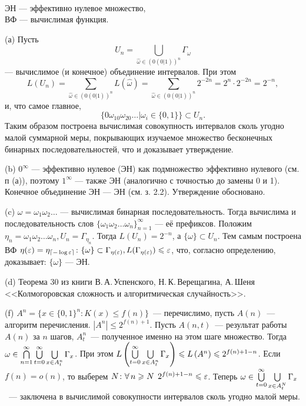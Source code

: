 \\
ЭН --- эффективно нулевое множество,\\
ВФ --- вычислимая функция.

(а) Пусть $$U_n=\bigcup\limits_{\hat\omega\in\left(0(0|1)\right)^n}\Gamma_{\hat\omega}$$ --- вычислимое (и конечное) объединение интервалов. При этом $$L(U_n)=\sum\limits_{\hat\omega\in\left(0(0|1)\right)^n}L(\hat\omega) = \sum\limits_{\hat\omega\in\left(0(0|1)\right)^n} 2^{-2n} = 2^n\cdot 2^{-2n} = 2^{-n},$$ и, что самое главное, $$\{0\omega_10\omega_20\ldots|\omega_i\in\{0,1\}\}\subset U_n.$$ Таким образом построена вычислимая совокупность интервалов сколь угодно малой суммарной меры, покрывающих изучаемое множество бесконечных бинарных последовательностей, что и доказывает утверждение.

(b) $0^\infty$ --- эффективно нулевое (ЭН) как подмножество эффективно нулевого (см. п (а)), поэтому $1^\infty$ --- также ЭН (аналогично с точностью до замены 0 и 1). Конечное объединение ЭН --- ЭН (см. з. 2.2). Утверждение обосновано.

(c) %
$\omega = \omega_1\omega_2\ldots$ --- вычислимая бинарная последовательность. Тогда вычислима и последовательность слов $\{\omega_1\omega_2\ldots\omega_n\}_{n=1}^\infty$ --- её префиксов. Положим  $\eta_n = \omega_1\omega_2\ldots\omega_n, U_n = \Gamma_{\eta_n}.$ Тогда $L(U_n) = 2^{-n}$, а  $\{\omega\}\subset U_n$. Тем самым построена ВФ $\eta(\varepsilon)=\eta_{\lceil-\log \varepsilon \rceil} \colon \{\omega\}\subset\Gamma_{\eta(\varepsilon)}, L(\Gamma_{\eta(\varepsilon)})\leqslant \varepsilon$, что, согласно определению, доказывает: $\{\omega\}$ --- ЭН.

(d) Теорема 30 из книги В.\,А.\,Успенского, Н.\,К.\,Верещагина, А.\,Шеня <<Колмогоровская сложность и алгоритмическая случайность>>.

(f) $A^n = \{x\in\{0,1\}^n\colon K(x)\le f(n)\}$~--- перечислимо, пусть $A(n)$~--- алгоритм перечисления. $|A^n|\le 2^{f(n) + 1}.$ Пусть $A(n,t)$~--- результат работы $A(n)$ за $n$ шагов, $A^n_t$~--- полученное именно на этом шаге множество.
Тогда $\omega\in\bigcap\limits_{n=1}^{\infty}\bigcup\limits_{t=0}^{\infty}\bigcup\limits_{x\in A^n_t}^{}\Gamma_x$. При этом $L\left(\bigcup\limits_{t=0}^{\infty}\bigcup\limits_{x\in A^n_t}^{}\Gamma_x\right) \leqslant L\left(A^n\right) \leqslant 2^{f(n)+1-n}$. Если $f(n)=o(n)$, то выберем $N\colon\forall\,n\geqslant N\:\: 2^{f(n)+1-n} \leqslant \varepsilon$. Теперь $\omega\in\bigcup\limits_{t=0}^{\infty}\bigcup\limits_{x\in A^N_t}^{}\Gamma_x$~--- заключена в вычислимой совокупности интервалов сколь угодно малой меры.

